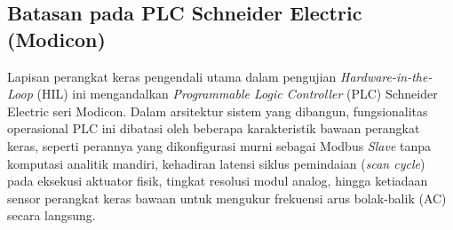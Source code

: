 \subsection{Batasan pada PLC Schneider Electric (Modicon)}
\label{subsec:Batasan_pada_PLC_Schneider_Electric}

Lapisan perangkat keras pengendali utama dalam pengujian \textit{Hardware-in-the-Loop} (HIL) ini mengandalkan \textit{Programmable Logic Controller} (PLC) Schneider Electric seri Modicon. Dalam arsitektur sistem yang dibangun, fungsionalitas operasional PLC ini dibatasi oleh beberapa karakteristik bawaan perangkat keras, seperti perannya yang dikonfigurasi murni sebagai Modbus \textit{Slave} tanpa komputasi analitik mandiri, kehadiran latensi siklus pemindaian (\textit{scan cycle}) pada eksekusi aktuator fisik, tingkat resolusi modul analog, hingga ketiadaan sensor perangkat keras bawaan untuk mengukur frekuensi arus bolak-balik (AC) secara langsung.

